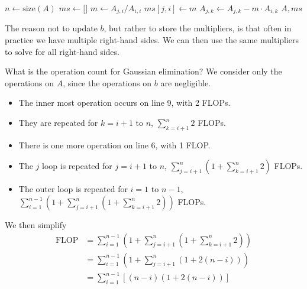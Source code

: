 \begin{algorithm}[H]
    \begin{algorithmic}[1]
        \State \( n \gets \text{size}(A) \)
        \State \( ms \gets \texttt{[]} \) 
         
         
        \State \( m \gets A_{j,i} / A_{i,i} \)
        \State \( ms[j,i] \gets m \)
        \State \( A_{j,k} \gets A_{j,k} - m \cdot A_{i,k} \)
        \EndFor
        \EndFor
        \EndFor
        \State \Return \( A, ms \)
        \EndFunction
    \end{algorithmic}
\end{algorithm}

\begin{remark}
    The reason not to update \( b \), but rather to store the multipliers, is that often in practice we have multiple right-hand sides. We can then use the same multipliers to solve for all right-hand sides.
\end{remark}

What is the operation count for Gaussian elimination? We consider only the operations on \( A \), since the operations on \( b \) are negligible.

\begin{itemize}
    \item The inner most operation occurs on line 9, with 2 FLOPs.
    \item They are repeated for \( k = i+1 \) to \( n \), \( \sum_{k=i+1}^n 2 \) FLOPs.
    \item There is one more operation on line 6, with 1 FLOP.
    \item The \( j \) loop is repeated for \( j = i+1 \) to \( n \), \( \sum_{j=i+1}^n \left( 1 + \sum_{k=i+1}^n 2 \right) \) FLOPs.
    \item The outer loop is repeated for \( i = 1 \) to \( n-1 \), \( \sum_{i=1}^{n-1} \left( 1 + \sum_{j=i+1}^n \left( 1 + \sum_{k=i+1}^n 2 \right) \right) \) FLOPs.
\end{itemize}

We then simplify
\begin{align*}
    \operatorname{FLOP}
     &
    = \sum_{i=1}^{n-1} \left( 1 + \sum_{j=i+1}^n \left( 1 + \sum_{k=i+1}^n 2 \right) \right)
    \\
     &
    = \sum_{i=1}^{n-1} \left( 1 + \sum_{j=i+1}^n \left( 1 + 2(n - i) \right) \right)
    \\
     &
    = \sum_{i=1}^{n-1} \left[ (n - i) (1 + 2(n - i)) \right]
\end{align*}

